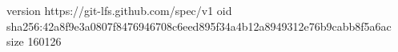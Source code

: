 version https://git-lfs.github.com/spec/v1
oid sha256:42a8f9e3a0807f8476946708c6eed895f34a4b12a8949312e76b9cabb8f5a6ac
size 160126
